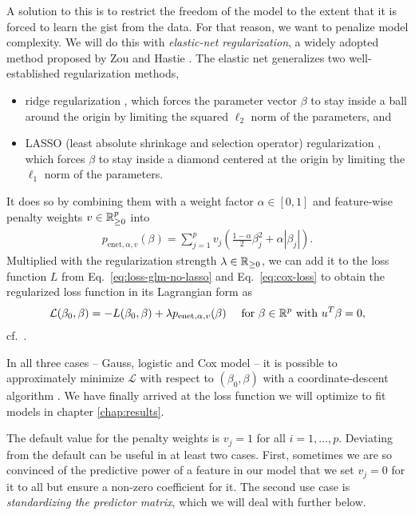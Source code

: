 A solution to this is to restrict the freedom of the model to the extent that it is forced to 
learn the gist from the data. For that reason, we want to penalize model complexity. We will do this 
with \textit{elastic-net regularization}, a widely adopted method proposed by Zou and Hastie 
\cite{elasticnet05}. The elastic net generalizes two well-established regularization methods,
\begin{itemize}
    \item ridge regularization \cite{ridge70}, which forces the parameter vector $\beta$ to 
        stay inside a ball around the origin by limiting the squared $\ell_2$ norm 
        of the parameters, and 
    \item LASSO (least absolute shrinkage and selection operator) regularization \cite{lasso18}, 
        which forces $\beta$ to stay inside a diamond centered at the origin by limiting the 
        $\ell_1$ norm of the parameters.
\end{itemize}
It does so by combining them with a weight factor $\alpha \in [0, 1]$ and feature-wise penalty 
weights $v \in \mathbb{R}_{\geq 0}^p$ into
\begin{align}\label{eq:enet-weights}
    p_{\text{enet}, \alpha, v}(\beta) = \sum_{j=1}^p v_j \left( \frac{1-\alpha}{2} \beta_j^2 +
    \alpha |\beta_j| \right).
\end{align}
Multiplied with the regularization strength $\lambda \in \mathbb{R}_{\geq 0}$, we can add it to the loss 
function $L$ from Eq.\ \eqref{eq:loss-glm-no-lasso} and Eq.\ \eqref{eq:cox-loss} to obtain the 
regularized loss function in its Lagrangian form as 
\begin{align}\label{eq:loss-elastic-net}
    \mathcal{L}(\beta_0, \beta) = -L(\beta_0, \beta) + \lambda p_{\text{enet}, \alpha, v}(\beta) 
    \quad \text{ for } \beta \in \mathbb{R}^p \text{ with } u^T \beta = 0,
\end{align}
cf.\ \cite[Eq.\ (3.15)]{rehberg-thesis18}.

In all three cases -- Gauss, logistic and Cox model -- it is possible to approximately minimize 
$\mathcal{L}$ with respect to $(\beta_0, \beta)$ with a coordinate-descent algorithm 
\cite[section 2.3]{zerosum16}. We have finally arrived at the loss function we will optimize to 
fit models in chapter \ref{chap:results}.

The default value for the penalty weights is $v_j = 1$ for all $i = 1, \ldots, p$. Deviating from 
the default can be useful 
in at least two cases. First, sometimes we are so convinced of the predictive 
power of a feature in our model that we set $v_j = 0$ for it to all but ensure a non-zero 
coefficient for it. The second use case is \textit{standardizing the predictor matrix}, which 
we will deal with further below.

